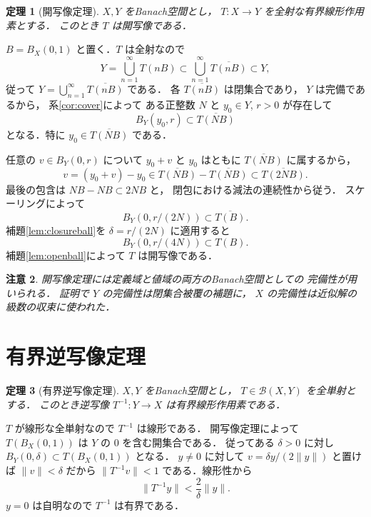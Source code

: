 \documentclass[a5paper,10pt,onecolumn]{jsarticle}
\makeatletter
\theoremstyle{mathnotetheorem}
\newtheorem{theorem}{定理}[section]
\newtheorem{remark}[theorem]{注意}
\renewcommand{\proofname}{証明}
\renewenvironment{proof}[1][\proofname]{%
  \par\pushQED{\qed}\normalfont\topsep4\p@\@plus2\p@\relax
  \trivlist\item[\hskip\labelsep\bfseries #1]\ignorespaces
}{\popQED\endtrivlist\@endpefalse}
\makeatother
\begin{document}
\begin{theorem}[開写像定理]\label{thm:open}
$X,Y$ をBanach空間とし，
$T:X\to Y$ を全射な有界線形作用素とする．
このとき $T$ は開写像である．
\end{theorem}
\begin{proof}
$B=B_X(0,1)$ と置く．$T$ は全射なので
\[
 Y=\bigcup_{n=1}^\infty T(nB)
 \subset\bigcup_{n=1}^\infty\overline{T(nB)}
 \subset Y,
\]
従って
$Y=\bigcup_{n=1}^\infty\overline{T(nB)}$ である．
各 $\overline{T(nB)}$ は閉集合であり，
$Y$ は完備であるから，
系\ref{cor:cover}によって
ある正整数 $N$ と $y_0\in Y$, $r>0$ が存在して
\[
 B_Y(y_0,r)\subset\overline{T(NB)}
\]
となる．特に $y_0\in\overline{T(NB)}$ である．

任意の $v\in B_Y(0,r)$ について
$y_0+v$ と $y_0$ はともに
$\overline{T(NB)}$ に属するから，
\[
 v=(y_0+v)-y_0
 \in\overline{T(NB)}-\overline{T(NB)}
 \subset\overline{T(2NB)}.
\]
最後の包含は $NB-NB\subset2NB$ と，
閉包における減法の連続性から従う．
スケーリングによって
\[
 B_Y(0,r/(2N))
 \subset\overline{T(B)}.
\]
補題\ref{lem:closureball}を
$\delta=r/(2N)$ に適用すると
\[
 B_Y(0,r/(4N))\subset T(B).
\]
補題\ref{lem:openball}によって $T$ は開写像である．
\end{proof}

\begin{remark}
開写像定理には定義域と値域の両方のBanach空間としての
完備性が用いられる．
証明で $Y$ の完備性は閉集合被覆の補題に，
$X$ の完備性は近似解の級数の収束に使われた．
\end{remark}

\section{有界逆写像定理}

\begin{theorem}[有界逆写像定理]\label{thm:inverse}
$X,Y$ をBanach空間とし，
$T\in\mathcal B(X,Y)$ を全単射とする．
このとき逆写像 $T^{-1}:Y\to X$ は有界線形作用素である．
\end{theorem}
\begin{proof}
$T$ が線形な全単射なので $T^{-1}$ は線形である．
開写像定理によって $T(B_X(0,1))$ は
$Y$ の $0$ を含む開集合である．
従ってある $\delta>0$ に対し
$B_Y(0,\delta)\subset T(B_X(0,1))$ となる．
$y\ne0$ に対して
$v=\delta y/(2\|y\|)$ と置けば
$\|v\|<\delta$ だから
$\|T^{-1}v\|<1$ である．線形性から
\[
 \|T^{-1}y\|
 <\frac{2}{\delta}\|y\|.
\]
$y=0$ は自明なので $T^{-1}$ は有界である．
\end{proof}
\end{document}
